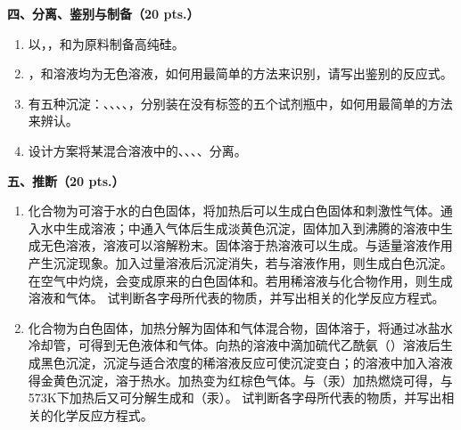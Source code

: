 \vspace{0.5cm}
\noindent\textbf{四、分离、鉴别与制备（20 pts.）}

\begin{enumerate}[label=\arabic*., start=1, itemsep=1.5ex]
    \item 以，，和为原料制备高纯硅。
    \item {}，和溶液均为无色溶液，如何用最简单的方法来识别，请写出鉴别的反应式。
    \item 有五种沉淀：、、、、，分别装在没有标签的五个试剂瓶中，如何用最简单的方法来辨认。
    \item 设计方案将某混合溶液中的、、、、分离。
\end{enumerate}

\vspace{0.5cm}
\noindent\textbf{五、推断（20 pts.）}

\begin{enumerate}[label=\arabic*., start=1, itemsep=1.5ex]
    \item 化合物为可溶于水的白色固体，将加热后可以生成白色固体和刺激性气体。通入水中生成溶液；中通入气体后生成淡黄色沉淀，固体加入到沸腾的溶液中生成无色溶液，溶液可以溶解粉末。固体溶于热溶液可以生成。与适量溶液作用产生沉淀现象。加入过量溶液后沉淀消失，若与溶液作用，则生成白色沉淀。在空气中灼烧，会变成原来的白色固体和。若用稀溶液与化合物作用，则生成溶液和气体。
    试判断各字母所代表的物质，并写出相关的化学反应方程式。
    \item 化合物为白色固体，加热分解为固体和气体混合物，固体溶于，将通过冰盐水冷却管，可得到无色液体和气体。向热的溶液中滴加硫代乙酰氨（）溶液后生成黑色沉淀，沉淀与适合浓度的稀溶液反应可使沉淀变白；的溶液中加入溶液得金黄色沉淀，溶于热水。加热变为红棕色气体。与（汞）加热燃烧可得，与573K下加热后又可分解生成和（汞）。
    试判断各字母所代表的物质，并写出相关的化学反应方程式。
\end{enumerate}